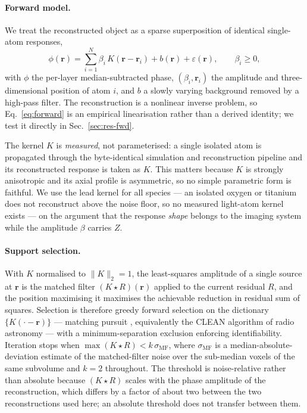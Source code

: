 \documentclass[aps,prb,twocolumn,superscriptaddress,floatfix,nofootinbib]{revtex4-2}
\begin{document}
\paragraph{Forward model.} We treat the reconstructed object as a sparse superposition of
identical single-atom responses,
\begin{equation}
  \phi(\mathbf{r}) = \sum_{i=1}^{N} \beta_i\, K(\mathbf{r}-\mathbf{r}_i) + b(\mathbf{r})
  + \varepsilon(\mathbf{r}), \qquad \beta_i \ge 0,
  \label{eq:forward}
\end{equation}
with $\phi$ the per-layer median-subtracted phase, $(\beta_i,\mathbf{r}_i)$ the amplitude and
three-dimensional position of atom $i$, and $b$ a slowly varying background removed by a
high-pass filter. The reconstruction is a nonlinear inverse problem, so
Eq.~\eqref{eq:forward} is an empirical linearisation rather than a derived identity; we test it
directly in Sec.~\ref{sec:res-fwd}.

The kernel $K$ is \emph{measured}, not parameterised: a single isolated atom is propagated
through the byte-identical simulation and reconstruction pipeline and its reconstructed
response is taken as $K$. This matters because $K$ is strongly anisotropic and its axial
profile is asymmetric, so no simple parametric form is faithful. We use the lead kernel for all
species --- an isolated oxygen or titanium does not reconstruct above the noise floor, so no
measured light-atom kernel exists --- on the argument that the response \emph{shape} belongs to
the imaging system while the amplitude $\beta$ carries $Z$.

\paragraph{Support selection.} With $K$ normalised to $\lVert K\rVert_2=1$, the least-squares
amplitude of a single source at $\mathbf{r}$ is the matched filter $(K\star R)(\mathbf{r})$
applied to the current residual $R$, and the position maximising it maximises the achievable
reduction in residual sum of squares. Selection is therefore greedy forward selection on the
dictionary $\{K(\cdot-\mathbf{r})\}$ --- matching pursuit \citep{MallatZhang1993}, equivalently
the CLEAN algorithm of radio astronomy \citep{Hogbom1974} --- with a minimum-separation
exclusion enforcing identifiability. Iteration stops when
$\max(K\star R) < k\,\sigma_{\mathrm{MF}}$, where $\sigma_{\mathrm{MF}}$ is a
median-absolute-deviation estimate of the matched-filter noise over the sub-median voxels of the
same subvolume and $k=2$ throughout. The threshold is noise-relative rather than absolute
because $(K\star R)$ scales with the phase amplitude of the reconstruction, which differs by a
factor of about two between the two reconstructions used here; an absolute threshold does not
transfer between them.
\end{document}
